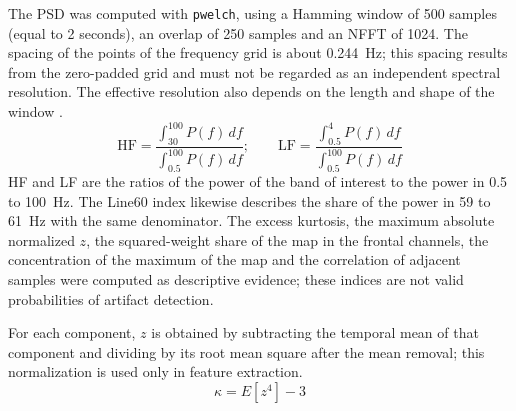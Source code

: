 The PSD was computed with \texttt{pwelch}, using a Hamming window of 500 samples (equal to 2 seconds), an overlap of 250 samples and an NFFT of 1024. The spacing of the points of the frequency grid is about 0.244~Hz; this spacing results from the zero-padded grid and must not be regarded as an independent spectral resolution. The effective resolution also depends on the length and shape of the window .
\begin{equation}
\mathrm{HF}=\frac{\int_{30}^{100}P(f)\,df}{\int_{0.5}^{100}P(f)\,df};\qquad
\mathrm{LF}=\frac{\int_{0.5}^{4}P(f)\,df}{\int_{0.5}^{100}P(f)\,df}
\end{equation}
HF and LF are the ratios of the power of the band of interest to the power in 0.5 to 100~Hz. The Line60 index likewise describes the share of the power in 59 to 61~Hz with the same denominator. The excess kurtosis, the maximum absolute normalized $z$, the squared-weight share of the map in the frontal channels, the concentration of the maximum of the map and the correlation of adjacent samples were computed as descriptive evidence; these indices are not valid probabilities of artifact detection.

For each component, $z$ is obtained by subtracting the temporal mean of that component and dividing by its root mean square after the mean removal; this normalization is used only in feature extraction.
\begin{equation}
\kappa=E[z^{4}]-3
\end{equation}
